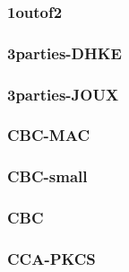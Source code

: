 

\begin{frame}\frametitle{1outof2}
\begin{figure}
\begin{center}

\end{center}
\end{figure}
\end{frame}
\begin{frame}\frametitle{3parties-DHKE}
\begin{figure}
\begin{center}

\end{center}
\end{figure}
\end{frame}
\begin{frame}\frametitle{3parties-JOUX}
\begin{figure}
\begin{center}

\end{center}
\end{figure}
\end{frame}
\begin{frame}\frametitle{CBC-MAC}
\begin{figure}
\begin{center}

\end{center}
\end{figure}
\end{frame}
\begin{frame}\frametitle{CBC-small}
\begin{figure}
\begin{center}

\end{center}
\end{figure}
\end{frame}
\begin{frame}\frametitle{CBC}
\begin{figure}
\begin{center}

\end{center}
\end{figure}
\end{frame}
\begin{frame}\frametitle{CCA-PKCS}
\begin{figure}
\begin{center}

\end{center}
\end{figure}
\end{frame}
